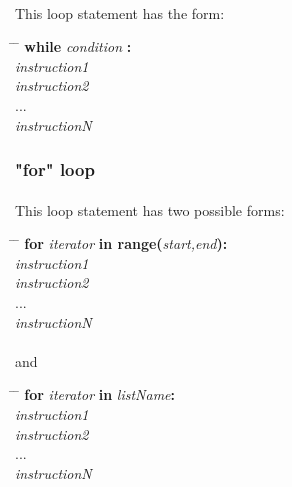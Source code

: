 \documentclass[12pt,a4paper]{article}
\begin{document}
\paragraph{}
This loop statement has the form:

\begin{tabbing}
\hspace{5cm} \= \hspace{1cm} \= \kill
   \> \textbf{while} \textit{condition} \textbf{:}  \\  
   \> \> \textit{instruction1} \\
   \> \> \textit{instruction2} \\
   \> \> ... \\
   \> \> \textit{instructionN} \\
\end{tabbing}


\subsubsection{"for" loop}

\paragraph{}
This loop statement has two possible forms:

\begin{tabbing}
\hspace{5cm} \= \hspace{1cm} \= \kill
   \> \textbf{for} \textit{iterator} \textbf{in range(}\textit{start,end}\textbf{):}  \\  
   \> \> \textit{instruction1} \\
   \> \> \textit{instruction2} \\
   \> \> ... \\
   \> \> \textit{instructionN} \\
\end{tabbing}

\paragraph{}
and

\begin{tabbing}
\hspace{5cm} \= \hspace{1cm} \= \kill
   \> \textbf{for} \textit{iterator} \textbf{in} \textit{listName}\textbf{:}  \\  
   \> \> \textit{instruction1} \\
   \> \> \textit{instruction2} \\
   \> \> ... \\
   \> \> \textit{instructionN} \\
\end{tabbing}
\end{document}

